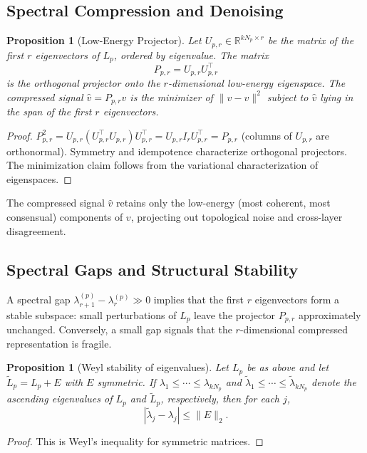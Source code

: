 \documentclass[11pt]{article}
\newtheorem{proposition}[theorem]{Proposition}
\theoremstyle{definition}
\theoremstyle{remark}
\newcommand{\R}{\mathbb{R}}
\newcommand{\Pp}{P_{p,r}}
\newcommand{\Up}{U_{p,r}}
\newcommand{\vhat}{\hat{v}}
\begin{document}
\subsection{Spectral Compression and Denoising}

\begin{proposition}[Low-Energy Projector]
\label{prop:compression}
Let $\Up\in\R^{kN_p\times r}$ be the matrix of the first $r$ eigenvectors of
$L_p$, ordered by eigenvalue. The matrix
\[
  \Pp = \Up\Up^\top
\]
is the orthogonal projector onto the $r$-dimensional low-energy eigenspace.
The compressed signal $\vhat = \Pp v$ is the minimizer of
$\|\vhat - v\|^2$ subject to $\vhat$ lying in the span of the first $r$
eigenvectors.
\end{proposition}

\begin{proof}
$\Pp^2 = \Up(\Up^\top\Up)\Up^\top = \Up I_r \Up^\top = \Pp$ (columns of $\Up$
are orthonormal). Symmetry and idempotence characterize orthogonal projectors.
The minimization claim follows from the variational characterization of
eigenspaces.
\end{proof}

The compressed signal $\vhat$ retains only the low-energy (most coherent,
most consensual) components of $v$, projecting out topological noise and
cross-layer disagreement.

\subsection{Spectral Gaps and Structural Stability}

A spectral gap $\lambda_{r+1}^{(p)}-\lambda_r^{(p)}\gg 0$ implies that the
first $r$ eigenvectors form a stable subspace: small perturbations of $L_p$
leave the projector $\Pp$ approximately unchanged. Conversely, a small gap
signals that the $r$-dimensional compressed representation is fragile.

\begin{proposition}[Weyl stability of eigenvalues]
\label{prop:weyl}
Let $L_p$ be as above and let $\widetilde{L}_p=L_p+E$ with $E$ symmetric. If
$\lambda_1\le\cdots\le\lambda_{kN_p}$ and
$\tilde{\lambda}_1\le\cdots\le\tilde{\lambda}_{kN_p}$ denote the ascending
eigenvalues of $L_p$ and $\widetilde{L}_p$, respectively, then for each $j$,
\[
|\tilde{\lambda}_j-\lambda_j|\le \|E\|_2.
\]
\end{proposition}

\begin{proof}
This is Weyl's inequality for symmetric matrices.
\end{proof}
\end{document}
